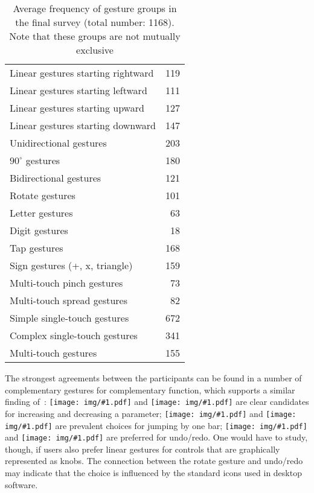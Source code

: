 \documentclass{aes130}
\newcommand{\sixthpic}[1][]{\texttt{[image: img/\#1.pdf]}}
\begin{document}
\begin{table}
\begin{center}
\begin{tabular}{lr} 

Linear gestures starting rightward &  119 \\ 
Linear gestures starting leftward  &  111 \\ 
Linear gestures starting upward    &  127 \\ 
Linear gestures starting downward  &  147 \\  \hline

Unidirectional gestures             &  203 \\ 
$90^\circ$ gestures                 &  180 \\ 
Bidirectional gestures              &  121 \\  \hline

Rotate gestures                     &  101 \\  \hline

Letter gestures                     & 63 \\ 
Digit gestures                      &  18 \\ 
Tap gestures                        & 168 \\ 
Sign gestures (+, x, triangle)      & 159 \\  \hline

Multi-touch pinch gestures          &  73 \\ 
Multi-touch spread gestures         &  82 \\ \hline

Simple single-touch gestures        & 672 \\ 
Complex single-touch gestures       &  341 \\ 
Multi-touch gestures                &  155 \\ 

\end{tabular}
\end{center}
\caption{Average frequency of gesture groups in the final survey (total number: 1168). Note that these groups are not mutually exclusive}
\label{tab:Survey2AverageGroups}
\end{table}

The strongest agreements between the participants can be found in a number of complementary gestures for complementary function, which supports a similar finding of~\cite{Wobbrock:2009:UGS:1518701.1518866}: \sixthpic[up] and \sixthpic[down] are clear candidates for increasing and decreasing a parameter; \sixthpic[right] and \sixthpic[left] are prevalent choices for jumping by one bar; \sixthpic[rotate-clockwise] and \sixthpic[rotate-counterclockwise] are preferred for undo/redo. One would have to study, though, if users also prefer linear gestures for controls that are graphically represented as knobs. The connection between the rotate gesture and undo/redo may indicate that the choice is influenced by the standard icons used in desktop software.
\end{document}
